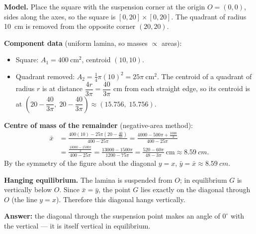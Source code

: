 \documentclass[11pt]{article}
\begin{document}
\begin{corrige}
\textbf{Model.} Place the square with the suspension corner at the origin $O=(0,0)$, sides along the axes, so the square is $[0,20]\times[0,20]$. The quadrant of radius \SI{10}{cm} is removed from the opposite corner $(20,20)$.

\textbf{Component data} (uniform lamina, so masses $\propto$ areas):
\begin{itemize}
\item Square: $A_1 = 400\ \mathrm{cm^2}$, centroid $(10,10)$.
\item Quadrant removed: $A_2 = \tfrac14\pi(10)^2 = 25\pi\ \mathrm{cm^2}$. The centroid of a quadrant of radius $r$ is at distance $\dfrac{4r}{3\pi} = \dfrac{40}{3\pi}$ cm from each straight edge, so its centroid is at $\left(20 - \dfrac{40}{3\pi},\; 20 - \dfrac{40}{3\pi}\right) \approx (15.756,\; 15.756)$.
\end{itemize}

\textbf{Centre of mass of the remainder} (negative-area method):
\begin{align*}
\bar{x} &= \frac{400(10) - 25\pi\left(20 - \frac{40}{3\pi}\right)}{400 - 25\pi}
= \frac{4000 - 500\pi + \frac{1000}{3}}{400 - 25\pi}\\
&= \frac{\frac{13000 - 1500\pi}{3}}{400 - 25\pi}
= \frac{13000 - 1500\pi}{1200 - 75\pi}
= \frac{520 - 60\pi}{48 - 3\pi}\ \mathrm{cm} \approx \SI{8.59}{cm}.
\end{align*}
By the symmetry of the figure about the diagonal $y = x$, $\bar{y} = \bar{x} \approx \SI{8.59}{cm}$.

\textbf{Hanging equilibrium.} The lamina is suspended from $O$; in equilibrium $G$ is vertically below $O$. Since $\bar{x} = \bar{y}$, the point $G$ lies exactly on the diagonal through $O$ (the line $y = x$). Therefore this diagonal hangs vertically.

\textbf{Answer:} the diagonal through the suspension point makes an angle of $\boxed{0^\circ}$ with the vertical — it is itself vertical in equilibrium.


\end{corrige}
\end{document}
